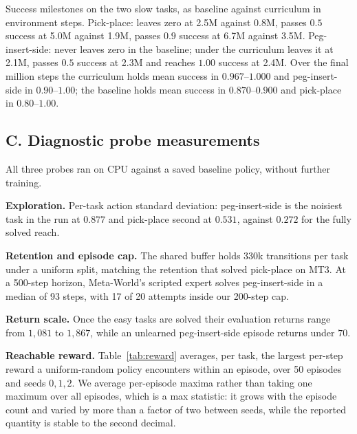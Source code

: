 \documentclass[letterpaper, 10 pt, conference]{ieeeconf}
\begin{document}
Success milestones on the two slow tasks, as baseline against curriculum in environment
steps. Pick-place: leaves zero at 2.5M against 0.8M, passes $0.5$ success at 5.0M against 1.9M,
passes $0.9$ success at 6.7M against 3.5M. Peg-insert-side: never leaves zero in the baseline;
under the curriculum leaves it at 2.1M, passes $0.5$ success at 2.3M and reaches $1.00$ success
at 2.4M. Over the final million steps the curriculum holds mean success in $0.967$--$1.000$ and
peg-insert-side in $0.90$--$1.00$; the baseline holds mean success in $0.870$--$0.900$ and
pick-place in $0.80$--$1.00$.

\subsection*{C. Diagnostic probe measurements}

All three probes ran on CPU against a saved baseline policy, without further training.

\textbf{Exploration.} Per-task action standard deviation: peg-insert-side is the
noisiest task in the run at $0.877$ and pick-place second at $0.531$, against $0.272$
for the fully solved reach.

\textbf{Retention and episode cap.} The shared buffer holds 330k transitions per task
under a uniform split, matching the retention that solved pick-place on MT3. At a 500-step
horizon, Meta-World's scripted expert solves peg-insert-side in a median of 93 steps, with 17
of 20 attempts inside our 200-step cap.

\textbf{Return scale.} Once the easy tasks are solved their evaluation returns range from
$1{,}081$ to $1{,}867$, while an unlearned peg-insert-side episode returns under $70$.

\textbf{Reachable reward.} Table~\ref{tab:reward} averages, per task, the largest per-step
reward a uniform-random policy encounters within an episode, over 50 episodes and seeds
$0,1,2$. We average per-episode maxima rather than taking one maximum over all episodes,
which is a max statistic: it grows with the episode count and varied by more than a factor of
two between seeds, while the reported quantity is stable to the second decimal.

\addtolength{\textheight}{-3cm}
\end{document}

